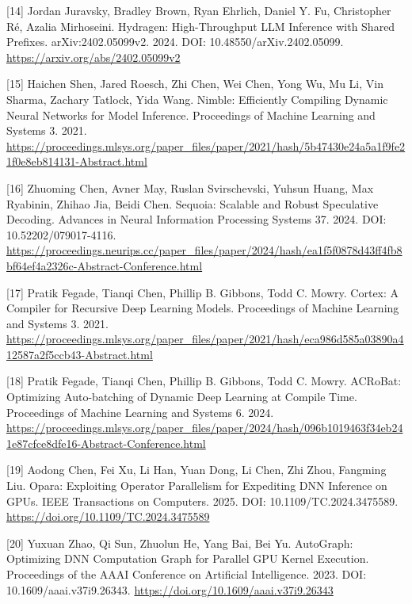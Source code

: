 \documentclass[UTF8,11pt,fontset=windows]{ctexart}
\begin{document}
\leavevmode{}%
{[}14{]} Jordan Juravsky, Bradley Brown, Ryan Ehrlich, Daniel Y. Fu, Christopher Ré, Azalia Mirhoseini. Hydragen: High-Throughput LLM Inference with Shared Prefixes. arXiv:2402.05099v2. 2024. DOI: 10.48550/arXiv.2402.05099. \url{https://arxiv.org/abs/2402.05099v2}

\leavevmode{}%
{[}15{]} Haichen Shen, Jared Roesch, Zhi Chen, Wei Chen, Yong Wu, Mu Li, Vin Sharma, Zachary Tatlock, Yida Wang. Nimble: Efficiently Compiling Dynamic Neural Networks for Model Inference. Proceedings of Machine Learning and Systems 3. 2021. \url{https://proceedings.mlsys.org/paper_files/paper/2021/hash/5b47430e24a5a1f9fe21f0e8eb814131-Abstract.html}

\leavevmode{}%
{[}16{]} Zhuoming Chen, Avner May, Ruslan Svirschevski, Yuhsun Huang, Max Ryabinin, Zhihao Jia, Beidi Chen. Sequoia: Scalable and Robust Speculative Decoding. Advances in Neural Information Processing Systems 37. 2024. DOI: 10.52202/079017-4116. \url{https://proceedings.neurips.cc/paper_files/paper/2024/hash/ea1f5f0878d43ff4fb8bf64ef4a2326c-Abstract-Conference.html}

\leavevmode{}%
{[}17{]} Pratik Fegade, Tianqi Chen, Phillip B. Gibbons, Todd C. Mowry. Cortex: A Compiler for Recursive Deep Learning Models. Proceedings of Machine Learning and Systems 3. 2021. \url{https://proceedings.mlsys.org/paper_files/paper/2021/hash/eca986d585a03890a412587a2f5ccb43-Abstract.html}

\leavevmode{}%
{[}18{]} Pratik Fegade, Tianqi Chen, Phillip B. Gibbons, Todd C. Mowry. ACRoBat: Optimizing Auto-batching of Dynamic Deep Learning at Compile Time. Proceedings of Machine Learning and Systems 6. 2024. \url{https://proceedings.mlsys.org/paper_files/paper/2024/hash/096b1019463f34eb241e87cfce8dfe16-Abstract-Conference.html}

\leavevmode{}%
{[}19{]} Aodong Chen, Fei Xu, Li Han, Yuan Dong, Li Chen, Zhi Zhou, Fangming Liu. Opara: Exploiting Operator Parallelism for Expediting DNN Inference on GPUs. IEEE Transactions on Computers. 2025. DOI: 10.1109/TC.2024.3475589. \url{https://doi.org/10.1109/TC.2024.3475589}

\leavevmode{}%
{[}20{]} Yuxuan Zhao, Qi Sun, Zhuolun He, Yang Bai, Bei Yu. AutoGraph: Optimizing DNN Computation Graph for Parallel GPU Kernel Execution. Proceedings of the AAAI Conference on Artificial Intelligence. 2023. DOI: 10.1609/aaai.v37i9.26343. \url{https://doi.org/10.1609/aaai.v37i9.26343}
\end{document}

